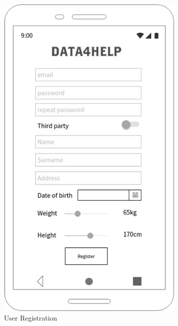 \begin{figure}[h!]
  \centering
  \begin{subfigure}[b]{0.4\linewidth}
    \includegraphics[width=\linewidth]{img/mockup/u_registration.jpg}
    \caption{User Registration}
  \end{subfigure}
 ~ ~ ~ ~ ~ ~
  \begin{subfigure}[b]{0.4\linewidth}

\end{subfigure}
\end{figure}

